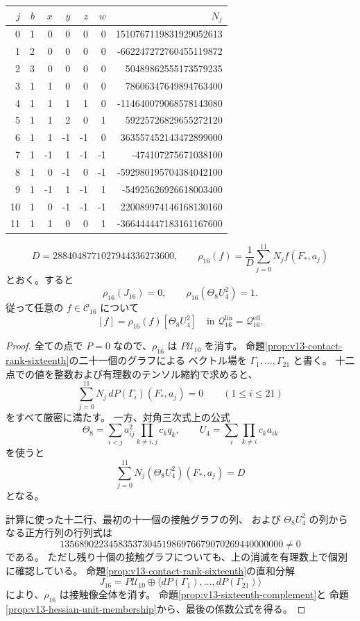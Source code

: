 \begin{center}
\small
\begin{tabular}{r|rrrrr|r}
 $j$&$b$&$x$&$y$&$z$&$w$&$N_j$\\ \hline
 0&1&0&0&0&0&1510767119831929052613\\
 1&2&0&0&0&0&-662247272760455119872\\
 2&3&0&0&0&0&50489862555173579235\\
 3&1&1&0&0&0&78606347649894763400\\
 4&1&1&1&1&0&-114640079068578143080\\
 5&1&1&2&0&1&59225726829655272120\\
 6&1&1&-1&-1&0&363557452143472899000\\
 7&1&-1&1&-1&-1&-474107275671038100\\
 8&1&0&-1&0&-1&-592980195704384042100\\
 9&1&-1&1&-1&1&-54925626926618003400\\
 10&1&0&-1&-1&-1&220089974146168130160\\
 11&1&1&0&0&1&-366444447183161167600
\end{tabular}
\end{center}

\begin{proposition}[十六次類の係数汎関数]
\label{prop:v13-diagonal-rho-sixteenth}
\[
 D=2884048771027944336273600,\qquad
 \rho_{16}(f)=\frac1D\sum_{j=0}^{11}N_j f(F_*,a_j)
\]
とおく。すると
\[
 \rho_{16}(J_{16})=0,\qquad
 \rho_{16}(\Theta_8U_4^2)=1.
\]
従って任意の $f\in\mathcal C_{16}$ について
\[
 [f]=\rho_{16}(f)[\Theta_8U_4^2]
 \quad\text{in }\mathcal Q^{\mathrm{lin}}_{16}
                   =\mathcal Q^{\mathrm{eff}}_{16}.
\]
\end{proposition}

\begin{proof}
全ての点で $P=0$ なので、$\rho_{16}$ は
$P\mathcal U_{10}$ を消す。
命題\ref{prop:v13-contact-rank-sixteenth}の二十一個のグラフによる
ベクトル場を $\Gamma_1,\ldots,\Gamma_{21}$ と書く。
十二点での値を整数および有理数のテンソル縮約で求めると、
\[
 \sum_{j=0}^{11}N_j\,dP(\Gamma_i)(F_*,a_j)=0
 \qquad(1\le i\le21)
\]
をすべて厳密に満たす。
一方、対角三次式上の公式
\[
 \Theta_8=\sum_{i<j}a_{ij}^2\prod_{k\ne i,j}c_kq_k,\qquad
 U_4=\sum_i\prod_{k\ne i}c_k a_{ik}
\]
を使うと
\[
 \sum_{j=0}^{11}N_j(\Theta_8U_4^2)(F_*,a_j)=D
\]
となる。

計算に使った十二行、最初の十一個の接触グラフの列、
および $\Theta_8U_4^2$ の列からなる正方行列の行列式は
\[
 1356890223458353730451986976679070269440000000\ne0
\]
である。
ただし残り十個の接触グラフについても、上の消滅を有理数上で個別に確認している。
命題\ref{prop:v13-contact-rank-sixteenth}の直和分解
\[
 J_{16}=P\mathcal U_{10}\oplus
           \langle dP(\Gamma_1),\ldots,dP(\Gamma_{21})\rangle
\]
により、$\rho_{16}$ は接触像全体を消す。
命題\ref{prop:v13-sixteenth-complement}と
命題\ref{prop:v13-hessian-unit-membership}から、最後の係数公式を得る。
\end{proof}

